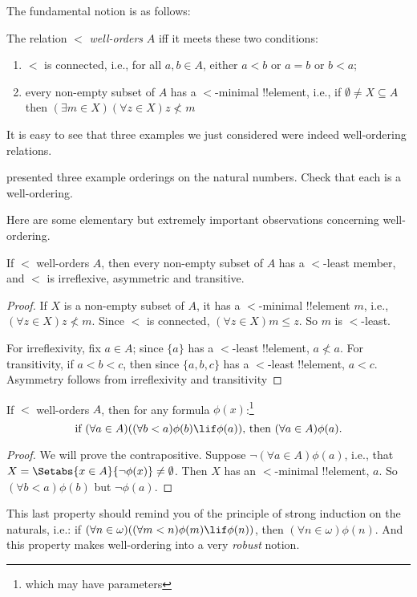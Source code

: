 \documentclass[../../../include/open-logic-section]{subfiles}
\begin{document}

The fundamental notion is as follows:

\begin{defn}
The relation $<$ \emph{well-orders} $A$ iff it meets these two conditions:
\begin{enumerate}
	\item $<$ is connected, i.e., for all $a, b \in A$, either $a < b$
	or $a = b$ or $b < a$;
	\item every non-empty subset of $A$ has a $<$-minimal !!{element},
	i.e., if $\emptyset \neq X \subseteq A$ then $(\exists m \in
	X)(\forall z \in X)z \nless m$
\end{enumerate}
\end{defn}

It is easy to see that three examples we just considered were indeed
well-ordering relations. 

\begin{prob}
 presented three example orderings
on the natural numbers. Check that each is a well-ordering.
\end{prob}

Here are some elementary but extremely important observations
concerning well-ordering.

\begin{prop}
If $<$ well-orders $A$, then every non-empty subset of $A$ has a
$<$-least member, and $<$ is irreflexive, asymmetric and transitive.
\end{prop}

\begin{proof}
If $X$ is a non-empty subset of $A$, it has a $<$-minimal !!{element}
$m$, i.e., $(\forall z \in X)z \nless m$. Since $<$ is connected,
$(\forall z \in X)m \leq z$. So $m$ is $<$-least.

For irreflexivity, fix $a \in A$; since $\{a\}$ has a $<$-least
!!{element}, $a \nless a$. For transitivity, if $a < b < c$, then
since $\{a, b, c\}$ has a $<$-least !!{element}, $a < c$. Asymmetry
follows from irreflexivity and transitivity
\end{proof}

\begin{prop}
If $<$ well-orders $A$, then for any formula $\phi(x)$:\footnote{which
may have parameters} 
\[
	\text{if }(\forall a \in A)((\forall b < a)\phi(b) \lif 
		\phi(a))\text{, then }(\forall a \in A)\phi(a).
\]
\end{prop}

\begin{proof}
We will prove the contrapositive. Suppose $\lnot(\forall a \in
A)\phi(a)$, i.e., that $X = \Setabs{x \in A}{\lnot\phi(x)} \neq
\emptyset$. Then $X$ has an $<$-minimal !!{element}, $a$. So $(\forall
b < a)\phi(b)$ but $\lnot \phi(a)$. \end{proof}\noindent This last
property should remind you of the principle of strong induction on the
naturals, i.e.: if $(\forall n \in \omega)((\forall m < n)\phi(m)
\lif \phi(n))$, then $(\forall n \in \omega)\phi(n)$. And this
property makes well-ordering into a very \emph{robust} notion. 
\end{document}
